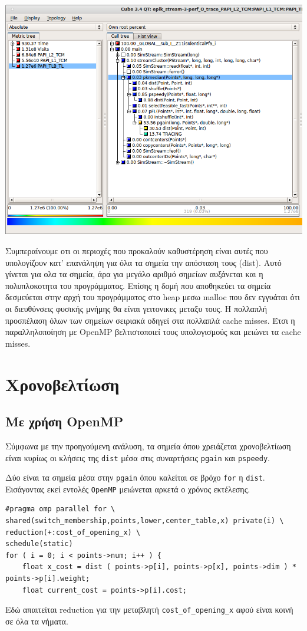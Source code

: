 \documentclass[a4paper,11pt]{article}
\begin{document}
\begin{center}
\includegraphics[width=\textwidth]{../scrshots/tlb.png}
\end{center} 
Συμπεραίνουμε οτι οι περιοχές που προκαλούν καθυστέρηση είναι αυτές που υπολογίζουν κατ' επανάληψη για όλα τα σημεία την απόσταση τους (dist). Αυτό γίνεται για ολα τα σημεία, άρα για μεγάλο αριθμό σημείων αυξάνεται και η πολυπλοκοτητα του προγράμματος. Επίσης η δομή που αποθηκεύει τα σημεία δεσμεύεται στην αρχή του προγράμματος στο heap μεσω malloc που δεν εγγυάται ότι οι διευθύνσεις φυσικής μνήμης θα είναι γειτονικες μεταξυ τους. Η πολλαπλή προσπέλαση όλων των σημείων σειριακά οδηγεί στα
πολλαπλά cache misses. Έτσι η παραλληλοποίηση με OpenMP βελτιστοποιεί τους υπολογισμούς και μειώνει τα cache misses.

\section{Χρονοβελτίωση}
\subsection{Με χρήση OpenMP}
Σύμφωνα με την προηγούμενη ανάλυση, τα σημεία όπου χρειάζεται χρονοβελτίωση είναι κυρίως οι κλήσεις της \texttt{dist} μέσα στις συναρτήσεις \texttt{pgain} και \texttt{pspeedy}.

Δύο είναι τα σημεία μέσα στην \texttt{pgain} όπου καλείται σε βρόχο \texttt{for} η \texttt{dist}. Εισάγοντας εκεί εντολές \texttt{OpenMP} μειώνεται αρκετά ο χρόνος εκτέλεσης.
\begin{lstlisting}
#pragma omp parallel for \
shared(switch_membership,points,lower,center_table,x) private(i) \
reduction(+:cost_of_opening_x) \
schedule(static)
for ( i = 0; i < points->num; i++ ) {
    float x_cost = dist ( points->p[i], points->p[x], points->dim ) * points->p[i].weight;
    float current_cost = points->p[i].cost;
\end{lstlisting}
Εδώ απαιτείται reduction για την μεταβλητή \texttt{cost\_of\_opening\_x} αφού είναι κοινή σε όλα τα νήματα.
\end{document}
